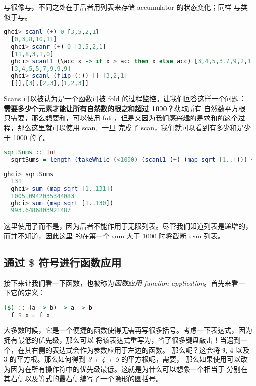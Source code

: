 \documentclass[./main.tex]{subfiles}
\begin{document}
与很像与，不同之处在于后者用列表来存储 accumulator 的状态变化；同样
与类似于与。

\begin{lstlisting}[language=Haskell]
  ghci> scanl (+) 0 [3,5,2,1]
  [0,3,8,10,11]
  ghci> scanr (+) 0 [3,5,2,1]
  [11,8,3,1,0]
  ghci> scanl1 (\acc x -> if x > acc then x else acc) [3,4,5,3,7,9,2,1]
  [3,4,5,5,7,9,9,9]
  ghci> scanl (flip (:)) [] [3,2,1]
  [[],[3],[2,3],[1,2,3]]
\end{lstlisting}

Scans 可以被认为是一个函数可被 fold 的过程监控。让我们回答这样一个问题：\textbf{需要多少个元素才能让所有自然数的根之和超过 1000？}获取所有
自然数平方根只需要，那么想要和，可以使用 fold，但是又因为我们感兴趣的是求和的这个过程，那么这里就可以使用 scan。一旦
完成了 scan，我们就可以看到有多少和是少于 1000 的了。

\begin{lstlisting}[language=Haskell]
  sqrtSums :: Int
  sqrtSums = length (takeWhile (<1000) (scanl1 (+) (map sqrt [1..]))) + 1
\end{lstlisting}

\begin{lstlisting}[language=Haskell]
  ghci> sqrtSums
  131
  ghci> sum (map sqrt [1..131])
  1005.0942035344083
  ghci> sum (map sqrt [1..130])
  993.6486803921487
\end{lstlisting}

这里使用了而不是，因为后者不能作用于无限列表。尽管我们知道列表是递增的，而并不知道，因此这里
的在第一个 sum 大于 1000 时将截断 scan 列表。

\subsection*{通过 \$ 符号进行函数应用}

接下来让我们看一下\acode{\$}函数，也被称为\textit{函数应用 function application}。首先来看一下它的定义：

\begin{lstlisting}[language=Haskell]
  ($) :: (a -> b) -> a -> b
  f $ x = f x
\end{lstlisting}

大多数时候，它是一个便捷的函数使得无需再写很多括号。考虑一下表达式，因为\acode{\$}拥有最低的优先级，那么可以
将该表达式重写为，省了很多键盘敲击！当遇到一个\acode{\$}，在其右侧的表达式会作为参数应用于左边的函数。
那么呢？这会将 9, 4 以及 3 的平方根。那么如何得到 \textit{3 + 4 + 9} 的平方根呢，需要，
那么如果使用\acode{\$}可以改为因为\acode{\$}在所有操作符中的优先级最低。这就是为什么可以想象一个\acode{\$}相当于
分别在其右侧以及等式的最右侧编写了一个隐形的圆括号。
\end{document}
